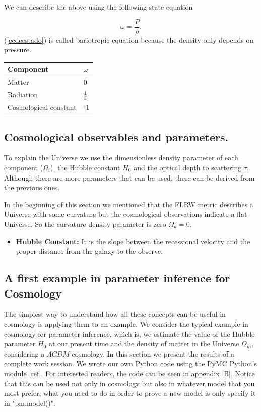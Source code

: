 \documentclass[onecolumn,           %
               showpacs,            %
               preprintnumbers,     %
               aps,                 %
               prl,          	    %
               letterpaper,             %
               superscriptaddress,      %
               nofootinbib,         %
               tightenlines,        %
               floats,floatfix      %
               ,usenatbib,
               ]{revtex4-1}
\begin{document}
We can describe the above using the following state equation

\begin{equation}
\label{ecdeestado}
\omega = \frac{P}{\rho}.
\end{equation}
(\ref{ecdeestado}) is called bariotropic equation because the density only depends on pressure.

\begin{table} [htbp]
	\begin{center}
		\begin{tabular}{|l|l|}
			\hline
			Component & $\omega$\\
			\hline
			Matter & 0 \\
			\hline
			Radiation & $\frac{1}{3}$\\
			\hline
			Cosmological constant & -1 \\
			\hline
		\end{tabular}
	\end{center}
\end{table} 

\subsection{Cosmological observables and parameters.}
To explain the Universe we use the dimensionless density parameter of each component ($\Omega_i$), the Hubble constant $H_0$ and the optical depth to
scattering $\tau$. Although there are more parameters that can be used, these can be derived from the previous ones.

In the beginning of this section we mentioned that the FLRW metric describes a Universe with some curvature but the cosmological observations indicate a flat Universe. So the curvature density parameter is zero $\Omega_k = 0$.

\begin{itemize}
	\item \textbf{Hubble Constant:} It is the slope between the recessional velocity and the proper distance from the galaxy to the observe.
\end{itemize}


\subsection{A first example in parameter inference for Cosmology}

The simplest way to understand how all these concepts can be useful in cosmology is applying them to an example. We consider the typical example in cosmology for parameter inference, which is, we estimate the value of the Hubble parameter $H_0$ at our present time and the density of matter in the Universe $\Omega_m$, considering a $\Lambda CDM$ cosmology. In this section we present the results of a complete work session. We wrote our own Python code using the PyMC Python's module [ref]. For interested readers, the code can be seen in appendix [B]. Notice that this can be used not only in cosmology but also in whatever model that you most prefer; what you need to do in order to prove a new model is only specify it in "pm.model()". 
\end{document}
